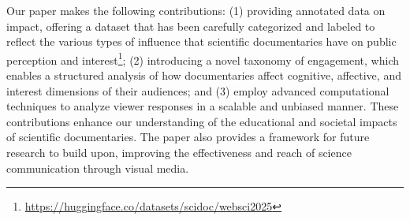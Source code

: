 Our paper makes the following contributions: (1) providing annotated data on impact, offering a dataset that has been carefully categorized and labeled to reflect the various types of influence that scientific documentaries have on public perception and interest\footnote{\url{https://huggingface.co/datasets/scidoc/websci2025}}; (2) introducing a novel taxonomy of engagement, which enables a structured analysis of how documentaries affect cognitive, affective, and interest dimensions of their audiences; and (3) employ advanced computational techniques to analyze viewer responses in a scalable and unbiased manner. 
These contributions enhance our understanding of the educational and societal impacts of scientific documentaries. The paper also provides a framework for future research to build upon, improving the effectiveness and reach of science communication through visual media.

